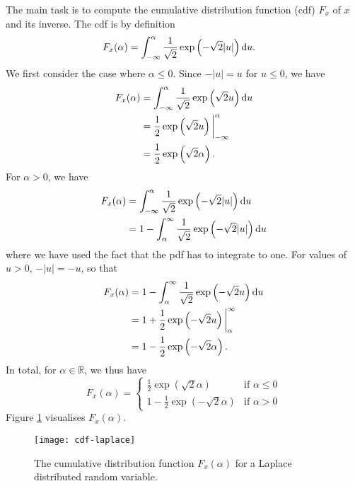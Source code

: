 \begin{solution}
  The main task is to compute the cumulative distribution function (cdf) $F_x$ of $x$ and its inverse. The cdf is by definition
  \begin{align}
    F_x(\alpha) & = \int_{-\infty}^\alpha  \frac{1}{\sqrt{2}} \exp\left(-\sqrt{2}|u|\right) \mathrm{d} u.
  \end{align}
  We first consider the case where $\alpha \le 0$. Since $-|u| = u$ for $u\le 0$, we have 
    \begin{align}
      F_x(\alpha) & = \int_{-\infty}^\alpha  \frac{1}{\sqrt{2}} \exp\left(\sqrt{2}u\right) \mathrm{d} u   \\
      & = \frac{1}{2} \exp\left(\sqrt{2}u\right) \bigg |_{-\infty}^\alpha\\
      & =  \frac{1}{2} \exp\left(\sqrt{2} \alpha\right).
    \end{align}
  For $\alpha >0$, we have
   \begin{align}
     F_x(\alpha) & = \int_{-\infty}^\alpha  \frac{1}{\sqrt{2}} \exp\left(-\sqrt{2}|u|\right) \mathrm{d} u   \\
     &= 1- \int_{\alpha}^\infty  \frac{1}{\sqrt{2}} \exp\left(-\sqrt{2}|u|\right) \mathrm{d} u        
   \end{align}
  where we have used the fact that the pdf has to integrate to one. For values of $u>0$, $-|u| = -u$, so that
   \begin{align}
     F_x(\alpha) & = 1 - \int_{\alpha}^\infty  \frac{1}{\sqrt{2}} \exp\left(-\sqrt{2} u \right) \mathrm{d} u  \\
     &= 1 + \frac{1}{2}  \exp\left(-\sqrt{2} u \right) \bigg |_{\alpha}^{\infty}\\
     &= 1 - \frac{1}{2}  \exp\left(-\sqrt{2} \alpha \right).
   \end{align}
  In total, for $\alpha \in \mathbb{R}$, we thus have
   \begin{equation}
     F_x(\alpha) = \begin{cases}
       \frac{1}{2} \exp\left(\sqrt{2} \alpha\right) & \text{if } \alpha \le 0\\
       1 - \frac{1}{2}  \exp\left(-\sqrt{2} \alpha\right) & \text{if } \alpha>0
     \end{cases}
   \end{equation}
  Figure \ref{fig:Fx} visualises $F_x(\alpha)$.
   \begin{figure}[h!]
     \centering
     \texttt{[image: cdf-laplace]}
     \caption{\label{fig:Fx} The cumulative distribution function $F_x(\alpha)$ for a Laplace distributed random variable.}
   \end{figure}
   

\end{solution}
